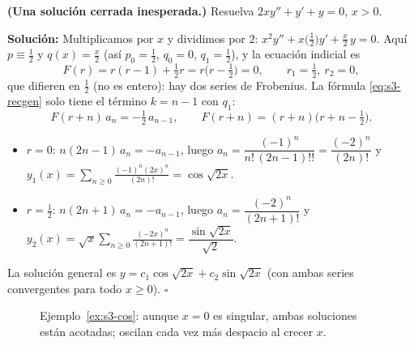 \begin{example}\label{ex:s3-cos}
\textbf{(Una solución cerrada inesperada.)} Resuelva $2xy''+y'+y=0$, $x>0$.
 
\noindent \textbf{Solución:} \quad Multiplicamos por $x$ y dividimos por $2$: $x^2y''+x\bigl(\tfrac12\bigr)y'+\tfrac{x}{2}\,y=0$. Aquí $p\equiv\frac12$ y $q(x)=\frac x2$ (así $p_0=\tfrac12$, $q_0=0$, $q_1=\tfrac12$), y la ecuación indicial es
\[ F(r)=r(r-1)+\tfrac12 r=r\bigl(r-\tfrac12\bigr)=0,\qquad r_1=\tfrac12,\ r_2=0, \]
que difieren en $\tfrac12$ (no es entero): hay dos series de Frobenius. La fórmula \eqref{eq:s3-recgen} solo tiene el término $k=n-1$ con $q_1$:
\[ F(r+n)\,a_n=-\tfrac12\,a_{n-1},\qquad F(r+n)=(r+n)\bigl(r+n-\tfrac12\bigr). \]
\begin{itemize}
\item $r=0$: $n(2n-1)\,a_n=-a_{n-1}$, luego $a_n=\dfrac{(-1)^n}{n!\,(2n-1)!!}=\dfrac{(-2)^n}{(2n)!}$ y $y_1(x)=\displaystyle\sum_{n\ge0}\frac{(-1)^n(2x)^n}{(2n)!}=\cos\sqrt{2x}$.
\item $r=\tfrac12$: $n(2n+1)\,a_n=-a_{n-1}$, luego $a_n=\dfrac{(-2)^n}{(2n+1)!}$ y $y_2(x)=\sqrt x\displaystyle\sum_{n\ge0}\frac{(-2x)^n}{(2n+1)!}=\dfrac{\sin\sqrt{2x}}{\sqrt2}$.
\end{itemize}
La solución general es $y=c_1\cos\sqrt{2x}+c_2\sin\sqrt{2x}$ (con ambas series convergentes para todo $x\ge0$). \hfill $\square$
\end{example}
 
\begin{figure}[H]
\centering
{}
\caption{Ejemplo~\ref{ex:s3-cos}: aunque $x=0$ es singular, ambas soluciones están acotadas; oscilan cada vez más despacio al crecer $x$.}
\label{fig:s3-cos}
\end{figure}
 
